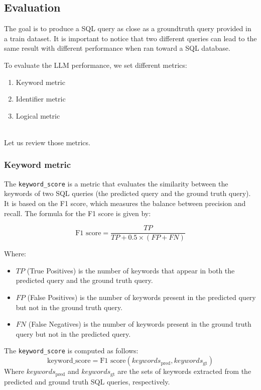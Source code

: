 \documentclass[12pt,a4paper]{article}
\begin{document}
\subsection*{Evaluation}
The goal is to produce a SQL query as close as a groundtruth query provided in a train dataset. It is important to notice that two different queries can lead to the same result with different performance when ran toward a SQL database.

To evaluate the LLM performance, we set different metrics:
\begin{enumerate}
    \item Keyword metric
    \item Identifier metric
    \item Logical metric
\end{enumerate}
\\
Let us review those metrics.

\subsubsection*{Keyword metric}

The \texttt{keyword\_score} is a metric that evaluates the similarity between the keywords of two SQL queries (the predicted query and the ground truth query). It is based on the F1 score, which measures the balance between precision and recall. The formula for the F1 score is given by:

\[
\text{F1 score} = \frac{TP}{TP + 0.5 \times (FP + FN)}
\]

Where:

\begin{itemize}
  \item \( TP \) (True Positives) is the number of keywords that appear in both the predicted query and the ground truth query.
  \item \( FP \) (False Positives) is the number of keywords present in the predicted query but not in the ground truth query.
  \item \( FN \) (False Negatives) is the number of keywords present in the ground truth query but not in the predicted query.
\end{itemize}

The \texttt{keyword\_score} is computed as follows:
\[
\text{keyword\_score} = \text{F1 score}(keywords_{\text{pred}}, keywords_{\text{gt}})
\]
Where \( keywords_{\text{pred}} \) and \( keywords_{\text{gt}} \) are the sets of keywords extracted from the predicted and ground truth SQL queries, respectively.
\end{document}
